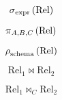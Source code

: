 \newpage
\begin{multicols}{2}
    
    \begin{CheatsheetEntryFrame}

        \begin{equation*}
            \operatorname{\sigma}_{\text{expr}}{(\text{Rel})}
        \end{equation*}

    \end{CheatsheetEntryFrame}

    \begin{CheatsheetEntryFrame}

        \begin{equation*}
            \operatorname{\pi}_{A,B,C}{(\text{Rel})}
        \end{equation*}

    \end{CheatsheetEntryFrame}

    \begin{CheatsheetEntryFrame}

        \begin{equation*}
            \operatorname{\rho}_{\text{schema}}{(\text{Rel})}
        \end{equation*}

    \end{CheatsheetEntryFrame}

    \begin{CheatsheetEntryFrame}

        \begin{equation*}
            \text{Rel}_1 \bowtie \text{Rel}_2
        \end{equation*}

    \end{CheatsheetEntryFrame}

    \begin{CheatsheetEntryFrame}

        \begin{equation*}
            \text{Rel}_1 \bowtie_C \text{Rel}_2
        \end{equation*}

    \end{CheatsheetEntryFrame}

\end{multicols}

